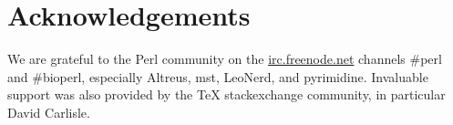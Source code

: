 \documentclass[a4paper,oneside,onecolumn,article,draft]{memoir}
\begin{document}
  
  
  
  
  
  
  

  \section{Acknowledgements}
    We are grateful to the Perl community on the \url{irc.freenode.net}
    channels \#perl and \#bioperl,
    especially Altreus, mst, LeoNerd, and pyrimidine.
    Invaluable support was also provided by the \TeX{} stackexchange community,
    in particular David Carlisle.

  

  \newpage
  \appendix
  
\end{document}
